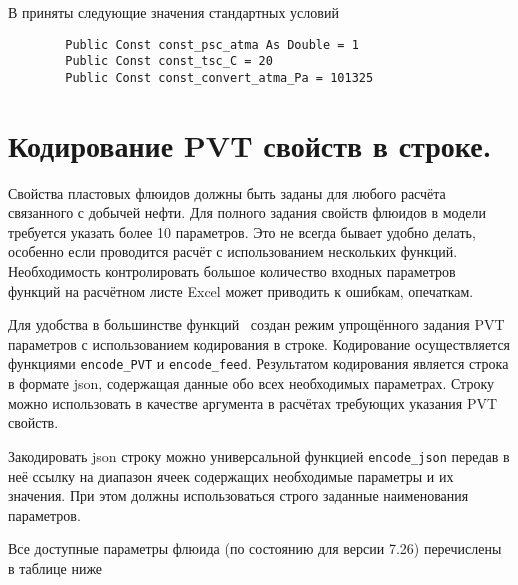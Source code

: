 	В \unf{} приняты следующие значения стандартных условий
	
	
	\begin{listing}[H]
		\begin{verbatim}
		Public Const const_psc_atma As Double = 1
		Public Const const_tsc_C = 20
		Public Const const_convert_atma_Pa = 101325
		\end{verbatim}
	\end{listing}

\section{Кодирование PVT свойств в строке.}
Свойства пластовых флюидов должны быть заданы для любого расчёта связанного с добычей нефти. Для полного задания свойств флюидов в модели \unf{} требуется указать более 10 параметров. Это не всегда бывает удобно делать, особенно если проводится расчёт с использованием нескольких функций. Необходимость контролировать большое количество входных параметров функций на расчётном листе Excel может приводить к ошибкам, опечаткам.

Для удобства в большинстве функций \unf{} \ создан режим упрощённого задания PVT параметров с использованием кодирования в строке. Кодирование осуществляется функциями \texttt{encode_PVT} и \texttt{encode_feed}. Результатом кодирования является  строка в формате json, содержащая данные обо всех необходимых параметрах. Строку можно использовать в качестве аргумента в расчётах требующих указания PVT свойств.   


Закодировать json строку можно универсальной функцией \texttt{encode_json} передав в неё ссылку на диапазон ячеек содержащих необходимые параметры и их значения. При этом должны использоваться строго заданные наименования параметров. 

Все доступные параметры флюида (по состоянию для версии 7.26) перечислены в таблице ниже

